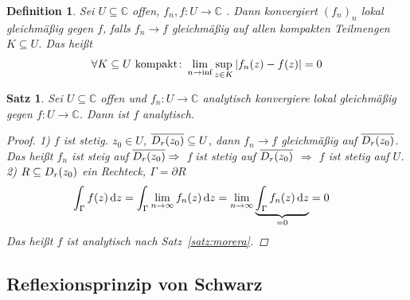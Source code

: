 \documentclass[11pt, a4paper]{article}
\theoremstyle{plain}
\newtheorem{definition}[blockelement]{Definition}
\newtheorem{satz}[blockelement]{Satz}
\numberwithin{equation}{subsection}
\newcommand{\of}[1]{\mathopen{}\mathclose{}\bgroup\left(#1\aftergroup\egroup\right)}
\newcommand{\abs}[1]{\left\lvert#1\right\rvert}
\newcommand{\impl}[0]{\Rightarrow{}}
\newcommand{\dif}{\mathop{}\!\mathrm{d}}
\newcommand{\toinf}{\to\infty}
\newcommand{\C}{\mathbb{C}}
\begin{document}
    \begin{definition}
        Sei $U\subseteq\C$ offen, $f_n, f: U\to\C$ . Dann konvergiert $(f_n)_n$ lokal gleichmäßig gegen $f$, falls $f_n \to f$ gleichmäßig auf allen kompakten Teilmengen $K\subseteq U$. Das heißt
        \begin{align*}
            \forall K\subseteq U\text{ kompakt}\colon \lim_{n\to\inf} \sup_{z\in K}\abs{f_n\of{z} - f\of{z}} = 0
        \end{align*}
    \end{definition}

    \begin{satz}
        Sei $U\subseteq\C$ offen und $f_n: U\to\C$ analytisch konvergiere lokal gleichmäßig gegen $f: U\to\C$. Dann ist $f$ analytisch.

        \begin{proof}
            1) $f$ ist stetig. $z_0\in U$, $\overline{D_r\of{z_0}}\subseteq U$, dann $f_n \to f$ gleichmäßig auf $\overline{D_r\of{z_0}}$. Das heißt $f_n$ ist steig auf $\overline{D_r\of{z_0}}\impl $ f ist stetig auf $\overline{D_r\of{z_0}}$ $\impl$ $f$ ist stetig auf $U$.\\
            2) $R\subseteq D_r\of{z_0}$ ein Rechteck, $\Gamma = \partial R$
            \begin{align*}
                \int_{\Gamma}^{} f\of{z} \dif z &= \int_{\Gamma}^{} \lim_{n\toinf} f_n\of{z} \dif z = \lim_{n\toinf} \underbrace{\int_{\Gamma}^{} f_n\of{z} \dif z}_{= 0} = 0
            \end{align*}
            Das heißt $f$ ist analytisch nach Satz~\ref{satz:morera}.
        \end{proof}
    \end{satz}

    \subsection{Reflexionsprinzip von Schwarz}
\end{document}
